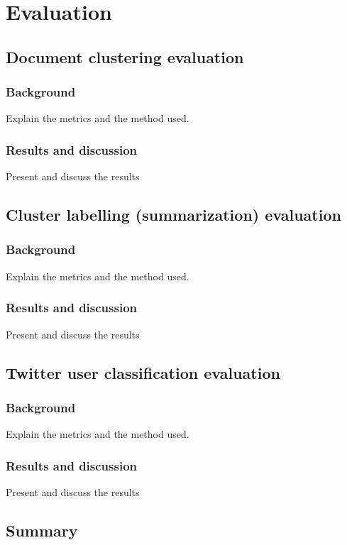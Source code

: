 \chapter{Evaluation}\label{Evaluation}
\ifpdf
    \graphicspath{{Chapter3/Chapter3Figs/PNG/}{Chapter3/Chapter3Figs/PDF/}{Chapter3/Chapter3Figs/}}
\else
    \graphicspath{{Chapter3/Chapter3Figs/EPS/}{Chapter3/Chapter3Figs/}}
\fi

\section{Document clustering evaluation}

\subsection{Background}
Explain the metrics and the method used.

\subsection{Results and discussion}

Present and discuss the results

\section{Cluster labelling (summarization) evaluation}

\subsection{Background}
Explain the metrics and the method used.

\subsection{Results and discussion}
Present and discuss the results

\section{Twitter user classification evaluation}

\subsection{Background}
Explain the metrics and the method used.

\subsection{Results and discussion}
Present and discuss the results

\section{Summary}



